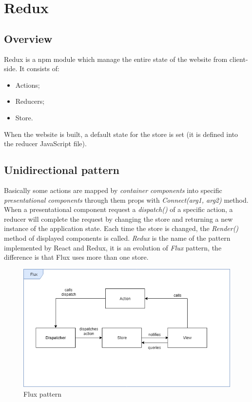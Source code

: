 \section{Redux} 
\subsection{Overview}
Redux is a npm module which manage the entire state of the website from client-side. It consists of:
\begin{itemize}
	\item Actions;
	\item Reducers;
	\item Store.
\end{itemize}
When the website is built, a default state for the store is set (it is defined into the reducer JavaScript file).
\subsection{Unidirectional pattern} 
Basically some actions are mapped by \textit{container components} into specific \textit{presentational components} through them props with \textit{Connect(arg1, arg2)} method. When a presentational component request a \textit{dispatch()} of a specific action, a reducer will complete the request by changing the store and returning a new instance of the application state. Each time the store is changed, the \textit{Render()} method of displayed components is called.
\textit{Redux} is the name of the pattern implemented by React and Redux, it is an evolution of \textit{Flux} pattern, the difference is that Flux uses more than one store.\\
\begin{figure}[H]
	\centering\includegraphics[scale = 0.6]{res/images/Flux.png}
	\caption{Flux pattern}
\end{figure}

